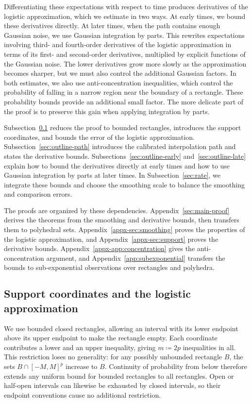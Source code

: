 \documentclass[11pt,letterpaper]{article}
\theoremstyle{remark}
\begin{document}
Differentiating these expectations with respect to time produces
derivatives of the logistic approximation, which we estimate in two
ways. At early times, we bound these derivatives directly. At later
times, when the path contains enough Gaussian noise, we use Gaussian
integration by parts. This rewrites expectations involving third- and
fourth-order derivatives of the logistic approximation in terms of its
first- and second-order derivatives, multiplied by explicit functions
of the Gaussian noise. The lower derivatives grow more slowly as the
approximation becomes sharper, but we must also control the additional
Gaussian factors. In both estimates, we also use anti-concentration
inequalities, which control the probability of falling in a narrow
region near the boundary of a rectangle. These probability bounds
provide an additional small factor. The more delicate part of the
proof is to preserve this gain when applying integration by parts.

Subsection~\ref{sec:outline-smoothing} reduces the proof to bounded
rectangles, introduces the support coordinates, and bounds the error
of the logistic approximation.
Subsection~\ref{sec:outline-path} introduces the calibrated
interpolation path and states the derivative bounds.
Subsections~\ref{sec:outline-early} and~\ref{sec:outline-late} explain
how to bound the derivatives directly at early times and how to use
Gaussian integration by parts at later times. In
Subsection~\ref{sec:rate}, we integrate these bounds and choose the
smoothing scale to balance the smoothing and comparison errors.

The proofs are organized by these dependencies. Appendix~\ref{sec:main-proof}
derives the theorems from the smoothing and derivative bounds, then
transfers them to polyhedral sets.
Appendix~\ref{appx-sec:smoothing} proves the properties of the logistic
approximation, and Appendix~\ref{appx-sec:support} proves the derivative
bounds. Appendix~\ref{appx-app:concentration} gives the anti-concentration
argument, and Appendix~\ref{app:subexponential} transfers the bounds
to sub-exponential observations over rectangles and polyhedra.

\subsection{Support coordinates and the logistic approximation}
\label{sec:outline-smoothing}

We use bounded closed rectangles, allowing an interval with its lower
endpoint above its upper endpoint to make the rectangle empty.
Each coordinate contributes a lower and an upper inequality, giving
\(m\coloneqq2p\) inequalities in all. This restriction loses no
generality: for any possibly unbounded rectangle \(B\), the sets
\(B\cap[-M,M]^p\) increase to \(B\).
Continuity of probability from below therefore extends any uniform
bound for bounded rectangles to all rectangles.
Open or half-open intervals can likewise be exhausted by closed
intervals, so their endpoint conventions cause no additional restriction.
\end{document}
